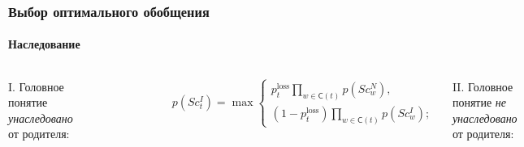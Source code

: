 \documentclass[aspectratio=169]{beamer}
\begin{document}
\newcommand{\ScIt}{Sc_t^I}
\newcommand{\ScNt}{Sc_t^N}
\newcommand{\ScIw}{Sc_w^I}
\newcommand{\ScNw}{Sc_w^N}
\newcommand{\children}[1] {\textsf{C}(#1)}
\newcommand{\pInhLost}{p_t^\text{loss}\prod_{w\in\children{t}}p(\ScNw)}
\newcommand{\pInhPass}{(1-p_t^\text{loss})\prod_{w\in\children{t}}p(\ScIw)}
\newcommand{\pNotInhGain}{p_t^\text{gain}\prod_{w\in\children{t}}p(\ScIw)}
\newcommand{\pNotInhPass}{(1-p_t^\text{gain})\prod_{w\in\children{t}}p(\ScNw)}

\begin{frame}
	\frametitle{Выбор оптимального обобщения}
	\framesubtitle{Наследование}
	\begin{columns}
		I. Головное понятие \emph{унаследовано} от родителя:
		\begin{figure}
			\centering
			\includegraphics[width=0.9\linewidth, clip]{images/mals_inher}
		\end{figure}
		\begin{equation*}
		p(\ScIt) = \max\begin{cases}
		\pInhLost,\\
		\pInhPass;
		\end{cases}
		\end{equation*}
		
		II. Головное понятие \emph{не унаследовано} от родителя:
		\begin{figure}
			\centering
			\includegraphics[width=0.9\linewidth, clip]{images/mals_notinher}
		\end{figure}
		\begin{equation*}
		p(\ScNt) = \max\begin{cases}
		\pNotInhGain, \\
		\pNotInhPass;
		\end{cases}
		\end{equation*}
		
	\end{columns}
	
	
	
	
\end{frame}
\end{document}
